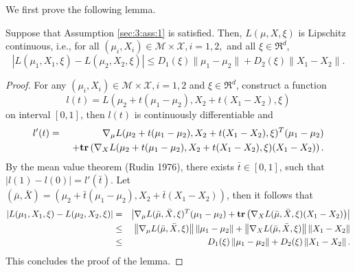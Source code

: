 We first prove the following lemma.

\begin{lemma}\label{sec:3:lem:1}
Suppose that Assumption \ref{sec:3:ass:1} is satisfied. Then,
$L(\mu,X,\xi)$ is Lipschitz continuous, i.e., for all
$(\mu_i,X_i)\in \mathcal{M}\times\mathcal {X},i=1,2,$ and all
$\xi\in \Re^d$,
\begin{equation*}
|L(\mu_1,X_1,\xi)-L(\mu_2,X_2,\xi)|\le
D_1(\xi)\|\mu_1-\mu_2\|+D_2(\xi)\|X_1-X_2\|.
\end{equation*}
\end{lemma}

\begin{proof}
For any $(\mu_i,X_i)\in \mathcal{M}\times\mathcal {X},i=1,2$ and
$\xi\in \Re^d$, construct a function
\[l(t)=L(\mu_2+t(\mu_1-\mu_2),X_2+t(X_1-X_2),\xi)\] on interval
$[0,1]$, then $l(t)$ is continuously differentiable and
\begin{eqnarray*}
l'(t) &=& \nabla_{\mu}L(\mu_2+t(\mu_1-\mu_2),X_2+t(X_1-X_2),\xi)^T
(\mu_1-\mu_2)\\
&&\ +{\bf tr}\left(\nabla_{X}L(\mu_2+t(\mu_1-\mu_2),X_2+t(X_1-X_2),
\xi)(X_1-X_2)\right).
\end{eqnarray*}
By the mean value theorem (Rudin 1976), there exists $\bar t\in
[0,1]$, such that $|l(1)-l(0)|=l'(\bar t)$. Let $(\bar\mu,\bar
X)=(\mu_2+\bar t(\mu_1-\mu_2),X_2+\bar t(X_1-X_2))$, then it follows
that
\begin{eqnarray}
\left|L(\mu_1,X_1,\xi)-L(\mu_2,X_2,\xi)\right|&=&\left|\nabla_{\mu}
L(\bar\mu,\bar X,\xi)^T (\mu_1-\mu_2)+{\bf
tr}\left(\nabla_{X}L(\bar\mu,\bar X,
\xi)(X_1-X_2)\right)\right|\nonumber\\
&\le& \left\|\nabla_{\mu}L(\bar\mu,\bar
X,\xi)\right\|\left\|\mu_1-\mu_2\right\|+\left\|\nabla_{X}L(\bar\mu,\bar
X,\xi)\right\|\left\|X_1-X_2\right\|\nonumber\\
&\le&
D_1(\xi)\left\|\mu_1-\mu_2\right\|+D_2(\xi)\left\|X_1-X_2\right\|.\nonumber
\end{eqnarray}
This concludes the proof of the lemma.
\end{proof}

